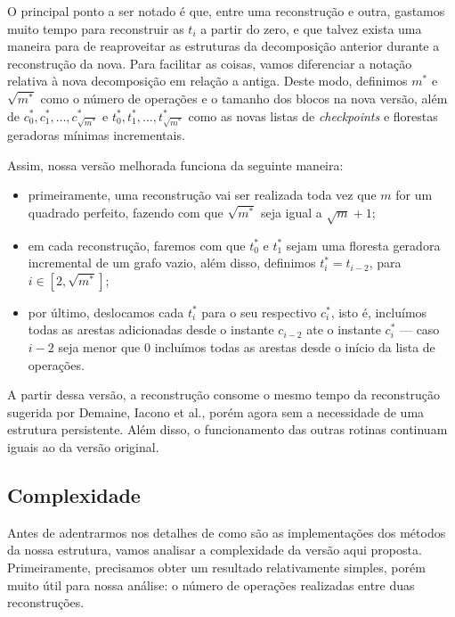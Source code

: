 O principal ponto a ser notado é que, entre uma reconstrução e outra, gastamos muito tempo para reconstruir as $t_i$ a partir do zero, e que talvez exista uma maneira para de reaproveitar as estruturas da decomposição anterior durante a reconstrução da nova. Para facilitar as coisas, vamos diferenciar a notação relativa à nova decomposição em relação a antiga. Deste modo, definimos $m^*$ e $\sqrt{m^*}$ como o número de operações e o tamanho dos blocos na nova versão, além de $c_0^*, c_1^*, \dots, c_{\sqrt{m^*}}^*$ e $t_0^*, t_1^*, \dots, t_{\sqrt{m^*}}^*$ como as novas listas de \emph{checkpoints} e florestas geradoras mínimas incrementais.

Assim, nossa versão melhorada funciona da seguinte maneira:

\begin{itemize}
    \item primeiramente, uma reconstrução vai ser realizada toda vez que $m$ for um quadrado perfeito, fazendo com que $\sqrt{m^*} $ seja igual a $\sqrt{m} + 1$;
    \item em cada reconstrução, faremos com que $t_0^*$ e $t_1^*$ sejam uma floresta geradora incremental de um grafo vazio, além disso, definimos $t_i^* = t_{i-2}$, para $i \in [2, \sqrt{m^*}]$;
    \item por último, deslocamos cada $t_i^*$ para o seu respectivo $c_i^*$, isto é, incluímos todas as arestas adicionadas desde o instante $c_{i-2}$ ate o instante $c_i^*$ --- caso $i-2$ seja menor que $0$ incluímos todas as arestas desde o início da lista de operações.
\end{itemize}

A partir dessa versão, a reconstrução consome o mesmo tempo da reconstrução sugerida por Demaine, Iacono et al., porém agora sem a necessidade de uma estrutura persistente. Além disso, o funcionamento das outras rotinas continuam iguais ao da versão original.

\subsection{Complexidade}
\label{sec:rmsf-complexidade}

Antes de adentrarmos nos detalhes de como são as implementações dos métodos da nossa estrutura, vamos analisar a complexidade da versão aqui proposta. Primeiramente, precisamos obter um resultado relativamente simples, porém muito útil para nossa análise: o número de operações realizadas entre duas reconstruções.

